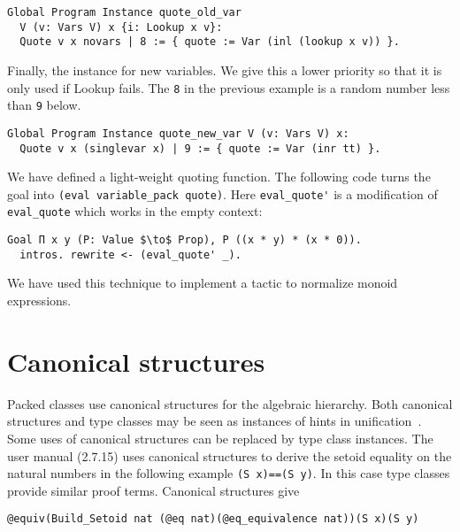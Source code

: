 \documentclass[a4paper,10pt,runningheads]{llncs}
\begin{document}
\begin{lstlisting}
Global Program Instance quote_old_var
  V (v: Vars V) x {i: Lookup x v}:
  Quote v x novars | 8 := { quote := Var (inl (lookup x v)) }.
\end{lstlisting}


\noindent Finally, the instance for new variables. We give this a lower priority so that it is only
used if Lookup fails. The \lstinline|8| in the previous example is a random number less than \lstinline|9| below. 

\begin{lstlisting}
Global Program Instance quote_new_var V (v: Vars V) x:
  Quote v x (singlevar x) | 9 := { quote := Var (inr tt) }.
\end{lstlisting}


We have defined a light-weight quoting function. The following code turns the goal into \lstinline|(eval variable_pack quote)|.
Here \lstinline|eval_quote'| is a modification of \lstinline|eval_quote| which works in the empty context:
\begin{lstlisting}
Goal Π x y (P: Value $\to$ Prop), P ((x * y) * (x * 0)).
  intros. rewrite <- (eval_quote' _).
\end{lstlisting}

We have used this technique to implement a tactic to normalize monoid expressions.

\section{Canonical structures}\label{canonical}
Packed classes use canonical structures for the algebraic hierarchy. Both canonical structures and
type classes may be seen as instances of hints in unification~\cite{Hints}. Some uses of canonical
structures can be replaced by type class instances. The user manual (2.7.15) uses canonical
structures to derive the setoid equality on the natural
numbers in the following example \lstinline|(S x)==(S y)|. In this case type classes provide similar proof
terms. Canonical structures give
\begin{lstlisting}
@equiv(Build_Setoid nat (@eq nat)(@eq_equivalence nat))(S x)(S y)
\end{lstlisting}
\end{document}

